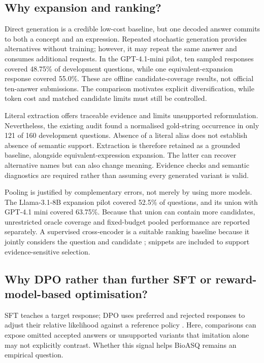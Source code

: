 \documentclass[12pt,a4paper]{article}
\begin{document}
\subsection{Why expansion and ranking?}

Direct generation is a credible low-cost baseline, but one decoded answer commits to both a concept and an expression. Repeated stochastic generation provides alternatives without training; however, it may repeat the same answer and consumes additional requests. In the GPT-4.1-mini pilot, ten sampled responses covered 48.75\% of development questions, while one equivalent-expansion response covered 55.0\%. These are offline candidate-coverage results, not official ten-answer submissions. The comparison motivates explicit diversification, while token cost and matched candidate limits must still be controlled.

Literal extraction offers traceable evidence and limits unsupported reformulation. Nevertheless, the existing audit found a normalised gold-string occurrence in only 121 of 160 development questions. Absence of a literal alias does not establish absence of semantic support. Extraction is therefore retained as a grounded baseline, alongside equivalent-expression expansion. The latter can recover alternative names but can also change meaning. Evidence checks and semantic diagnostics are required rather than assuming every generated variant is valid.

Pooling is justified by complementary errors, not merely by using more models. The Llama-3.1-8B expansion pilot covered 52.5\% of questions, and its union with GPT-4.1 mini covered 63.75\%. Because that union can contain more candidates, unrestricted oracle coverage and fixed-budget pooled performance are reported separately. A supervised cross-encoder is a suitable ranking baseline because it jointly considers the question and candidate \citep{nogueira2019passage}; snippets are included to support evidence-sensitive selection.

\subsection{Why DPO rather than further SFT or reward-model-based optimisation?}

SFT teaches a target response; DPO uses preferred and rejected responses to adjust their relative likelihood against a reference policy \citep{rafailov2023dpo}. Here, comparisons can expose omitted accepted answers or unsupported variants that imitation alone may not explicitly contrast. Whether this signal helps BioASQ remains an empirical question.
\end{document}
